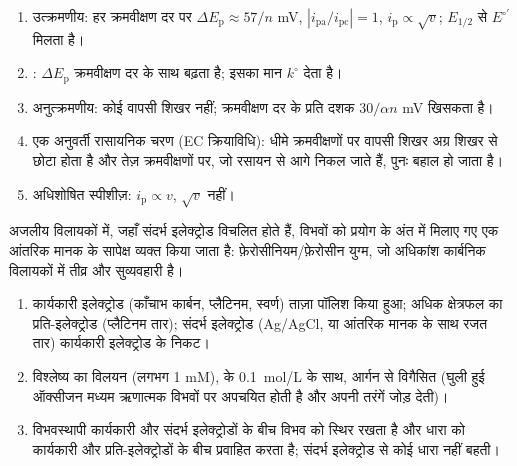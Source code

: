 \begin{method}[वोल्टामोग्राम का निदान]\label{met:b3:electrode-kinetics:cv-diagnosis}
\begin{enumerate}
  \item उत्क्रमणीय: हर क्रमवीक्षण दर पर $\Delta E_{\mathrm p} \approx 57/n$ \unit{mV}, $|i_{\mathrm{pa}}/i_{\mathrm{pc}}| = 1$, $i_{\mathrm p} \propto \sqrt v$;
        $E_{1/2}$ से $E^{\circ\prime}$ मिलता है।
  \item {}: $\Delta E_{\mathrm p}$ क्रमवीक्षण दर के साथ बढ़ता है; इसका मान $k^\circ$ देता है।
  \item अनुत्क्रमणीय: कोई वापसी शिखर नहीं;  क्रमवीक्षण दर के प्रति दशक $30/\alpha n$ \unit{mV}
        खिसकता है।
  \item एक अनुवर्ती रासायनिक चरण (EC क्रियाविधि): धीमे क्रमवीक्षणों पर वापसी शिखर
        अग्र शिखर से छोटा होता है और तेज़ क्रमवीक्षणों पर, जो रसायन से आगे निकल जाते हैं,
        पुनः बहाल हो जाता है।
  \item अधिशोषित स्पीशीज़: $i_{\mathrm p} \propto v$, $\sqrt v$ नहीं।
\end{enumerate}
\end{method}

अजलीय विलायकों में, जहाँ संदर्भ इलेक्ट्रोड विचलित होते हैं, विभवों को प्रयोग के अंत में
मिलाए गए एक आंतरिक मानक के सापेक्ष व्यक्त किया जाता है:
फ़ेरोसीनियम/फ़ेरोसीन युग्म, जो अधिकांश कार्बनिक विलायकों में तीव्र और सुव्यवहारी है।

\begin{method}[त्रि-इलेक्ट्रोड मापन की व्यवस्था]\label{met:b3:electrode-kinetics:three-electrode}
\begin{enumerate}
  \item कार्यकारी इलेक्ट्रोड (काँचाभ कार्बन, प्लैटिनम, स्वर्ण) ताज़ा पॉलिश किया हुआ;
        अधिक क्षेत्रफल का प्रति-इलेक्ट्रोड (प्लैटिनम तार); संदर्भ इलेक्ट्रोड
        (Ag/AgCl, या आंतरिक मानक के साथ रजत तार) कार्यकारी इलेक्ट्रोड
        के निकट।
  \item विश्लेष्य का विलयन (लगभग 1 \unit{mM}),  के \qty{0.1}{mol/L}
        के साथ, आर्गन से विगैसित (घुली हुई ऑक्सीजन
        मध्यम ऋणात्मक विभवों पर अपचयित होती है और अपनी तरंगें जोड़ देती)।
  \item विभवस्थापी कार्यकारी और संदर्भ इलेक्ट्रोडों के बीच विभव को स्थिर रखता है
        और धारा को कार्यकारी और प्रति-इलेक्ट्रोडों के बीच
        प्रवाहित करता है; संदर्भ इलेक्ट्रोड से कोई धारा नहीं बहती।
\end{enumerate}
\end{method}

